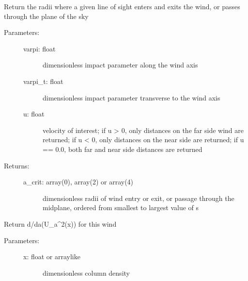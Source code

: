 \documentclass[letterpaper,10pt,english]{sphinxmanual}
\begin{document}
\begin{fulllineitems}
\begin{fulllineitems}
\end{fulllineitems}


\begin{fulllineitems}
\label{fulldoc:despotic.winds.pwind.a_crit}
Return the radii where a given line of sight enters and exits
the wind, or passes through the plane of the sky
\begin{description}
\item[{Parameters:}] \leavevmode\begin{description}
\item[{varpi: float}] \leavevmode
dimensionless impact parameter along the wind axis

\item[{varpi\_t: float}] \leavevmode
dimensionless impact parameter transverse to the wind axis

\item[{u: float}] \leavevmode
velocity of interest; if u \textgreater{} 0, only distances on the
far side wind are returned; if u \textless{} 0, only
distances on the near side are returned; if u == 0.0,
both far and near side distances are returned

\end{description}

\item[{Returns:}] \leavevmode\begin{description}
\item[{a\_crit: array(0), array(2) or array(4)}] \leavevmode
dimensionless radii of wind entry or exit, or
passage through the midplane, ordered from smallest to
largest value of s

\end{description}

\end{description}

\end{fulllineitems}


\begin{fulllineitems}
\label{fulldoc:despotic.winds.pwind.dU2da}
Return d/da(U\_a\textasciicircum{}2(x)) for this wind
\begin{description}
\item[{Parameters:}] \leavevmode\begin{description}
\item[{x: float or arraylike}] \leavevmode
dimensionless column density


\end{description}
\end{description}
\end{fulllineitems}
\end{fulllineitems}
\end{document}
